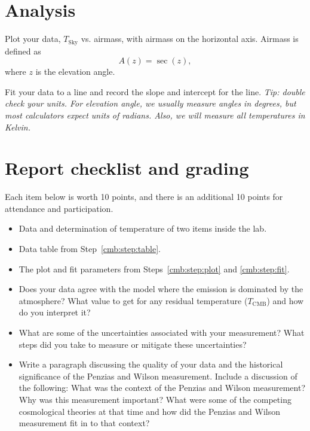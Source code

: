\section{Analysis}

\begin{steps}
	\item\label{cmb:step:plot} Plot your data, $T_\textrm{Sky}$ vs. airmass, with airmass on the horizontal axis. Airmass is defined as
	\begin{equation}
	 A(z) = \sec(z),
	\end{equation}
	where $z$ is the elevation angle.
	
	\item\label{cmb:step:fit} Fit your data to a line and record the slope and intercept for the line. \textit{Tip: double check your units. For elevation angle, we usually measure angles in degrees, but most calculators expect units of radians. Also, we will measure all temperatures in Kelvin.}
\end{steps}

\section{Report checklist and grading}

Each item below is worth 10 points, and there is an additional 10 points for attendance and participation.

\begin{itemize}
	\item Data and determination of temperature of two items inside the lab.
	
	\item Data table from Step~\ref{cmb:step:table}.
	
	\item The plot and fit parameters from Steps~\ref{cmb:step:plot} and \ref{cmb:step:fit}.
	
	\item Does your data agree with the model where the emission is dominated by the atmosphere?  What value to get for any residual temperature ($T_\textrm{CMB}$) and how do you interpret it?
	
	\item What are some of the uncertainties associated with your measurement? What steps did you take to measure or mitigate these uncertainties?
	
	\item Write a paragraph discussing the quality of your data and the historical significance of the Penzias and Wilson measurement. Include a discussion of the following: What was the context of the Penzias and Wilson measurement? Why was this measurement important? What were some of the competing cosmological theories at that time and how did the Penzias and Wilson measurement fit in to that context?
\end{itemize}